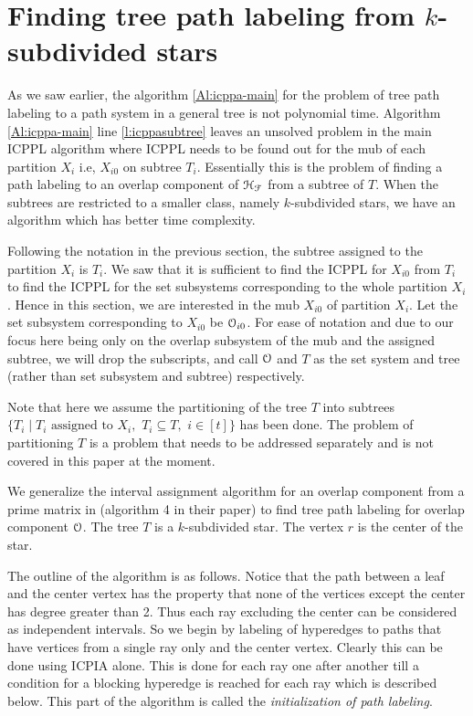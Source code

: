 \documentclass[a4paper,UKenglish,numberwithinsect]{lipics}
\def\cF{{\cal F}}
\def\cH{{\cal H}}
\def\cO{{\cal O}}
\begin{document}
\section{Finding tree path labeling from $k$-subdivided stars}
\label{sec:ksubdivstar}
As we saw earlier, the algorithm \ref{Al:icppa-main} for the problem
of tree path labeling to a path system in a general tree is not
polynomial time. Algorithm \ref{Al:icppa-main} line
\ref{l:icppasubtree} leaves an unsolved problem in the main ICPPL
algorithm where ICPPL needs to be found out for the mub of each
partition $X_i$ i.e, $X_{i0}$ on subtree $T_i$. Essentially this is
the problem of finding a path labeling to an overlap component of $\cH_\cF$ from a
subtree of $T$.
When the subtrees are restricted to a smaller class, namely 
$k$-subdivided stars, we have an algorithm which has better time complexity.

\noindent
Following the notation in the previous section, the subtree assigned to the partition
$X_i$ is $T_i$. We saw that it is sufficient to find the ICPPL for $X_{i0}$
from $T_i$ to find the ICPPL for the set subsystems corresponding to
the whole partition $X_i$. Hence in this section, we are interested in
the mub $X_{i0}$ of partition $X_i$.  Let the set subsystem
corresponding to $X_{i0}$ be $\cO_{i0}$. For ease of notation and due to our focus here being only on the overlap subsystem
of the mub and the assigned subtree, we will drop the subscripts, and
call $\cO$ and $T$ as the set system and tree (rather than set
subsystem and subtree) respectively.

\noindent
Note that here we assume the partitioning of the tree $T$
into subtrees $\{T_i \mid T_i \text{ assigned to } X_i,$ $T_i \subseteq T,$  $i \in [t]\}$ has been
done. The problem of partitioning $T$ is a problem that needs to be
addressed separately and is not covered in this paper at the moment.


\noindent
We generalize the interval assignment algorithm for an overlap
component from a prime matrix in \cite{nsnrs09} (algorithm 4 in their paper) to find
tree path labeling for overlap component $\cO$. The tree $T$ is a
$k$-subdivided star. The vertex $r$ is the center of the star.

\noindent
The outline of the algorithm is as follows. Notice that the path
between a leaf and the center vertex has the property that none of the
vertices except the center has degree greater than 2. Thus each ray excluding the center
can be considered as independent intervals. 
 So we begin by labeling of hyperedges to paths that have vertices
 from a single ray only and the center vertex. Clearly this can be
 done using ICPIA alone. This is done for each ray one
after another till a condition for a blocking hyperedge is reached
for each ray which is described below. This part of the algorithm is called the
{\em initialization of path labeling}. 
\end{document}
